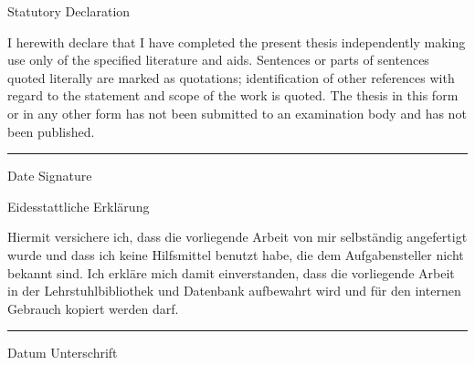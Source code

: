 \thispagestyle{plain}

\begin{center}
	\LARGE
	\vspace{3ex} Statutory Declaration
\end{center}

\normalsize

I herewith declare that I have completed the present thesis independently making use only of
the specified literature and aids. Sentences or parts of sentences quoted literally are marked as
quotations; identification of other references with regard to the statement and scope of the
work is quoted. The thesis in this form or in any other form has not been submitted to an
examination body and has not been published.

\vspace*{2cm}

\begin{flushright}
	\begin{minipage}[r]{10cm}
		\hrule\vspace*{1ex}\hspace{0.3cm} Date \hspace{1.5cm} Signature\\
		\vspace{1cm}
	\end{minipage}
\end{flushright}

\vspace*{2cm}


\begin{center}
    \LARGE
    \vspace{3ex} Eidesstattliche Erkl\"arung
\end{center}

Hiermit versichere ich, dass die vorliegende Arbeit von mir selbst\"andig angefertigt wurde und dass
ich keine Hilfsmittel benutzt habe, die dem Aufgabensteller nicht bekannt sind. Ich erkl\"are mich
damit einverstanden, dass die vorliegende Arbeit in der Lehrstuhlbibliothek und Datenbank aufbewahrt
wird und f\"ur den internen Gebrauch kopiert werden darf.

\vspace*{2cm}

\begin{flushright}
	\begin{minipage}[r]{10cm}
		\hrule\vspace*{1ex}\hspace{0.3cm} Datum \hspace{1.5cm} Unterschrift\\
		\vspace{1cm}
	\end{minipage}
\end{flushright}


\clearpage

